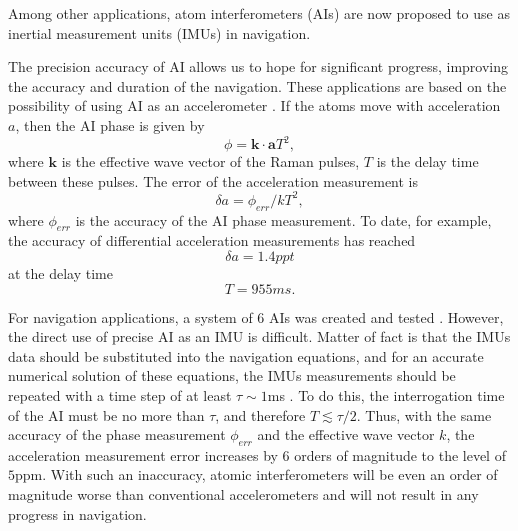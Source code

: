 \documentclass[twocolumn,showpacs,preprintnumbers]{revtex4}
\begin{document}
Among other applications, atom interferometers (AIs) are now proposed to use
as inertial measurement units (IMUs) in navigation.%

The precision accuracy of AI allows us to hope for significant progress,
improving the accuracy and duration of the navigation. These applications
are based on the possibility of using AI as an accelerometer \cite{c2}. If
the atoms move with acceleration $a$, then the AI phase is given by%
\begin{equation}
\phi =\mathbf{k}\cdot \mathbf{a}T^{2},  \label{1}
\end{equation}%
where $\mathbf{k}$ is the effective wave vector of the Raman pulses, $T$ is
the delay time between these pulses. The error of the acceleration
measurement is 
\begin{equation}
\delta a=\phi _{err}/kT^{2},  \label{2}
\end{equation}%
where $\phi _{err}$ is the accuracy of the AI phase measurement. To date,
for example, the accuracy of differential acceleration measurements has
reached 
\begin{equation}
\delta a=1.4ppt  \label{2.1}
\end{equation}%
at the delay time 
\begin{equation}
T=955ms.  \label{2.2}
\end{equation}

For navigation applications, a system of 6 AIs was created and tested \cite%
{c4}. However, the direct use of precise AI as an IMU is difficult. Matter
of fact is that the IMUs data should be substituted into the navigation
equations, and for an accurate numerical solution of these equations, the
IMUs measurements should be repeated with a time step of at least $\tau \sim
1$ms \cite{c5}. To do this, the interrogation time of the AI must be no more
than $\tau $, and therefore $T\lesssim \tau /2$. Thus, with the same
accuracy of the phase measurement $\phi _{err}$ and the effective wave
vector $k$, the acceleration measurement error increases by 6 orders of
magnitude to the level of $5$ppm. With such an inaccuracy, atomic
interferometers will be even an order of magnitude worse than conventional
accelerometers \cite{c6} and will not result in any progress in navigation.
\end{document}
